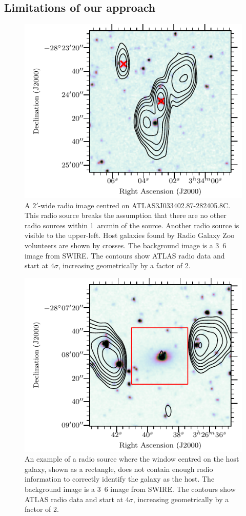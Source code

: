 \documentclass[11pt, a4paper]{book}
\begin{document}
  \subsection{Limitations of our approach}
    \label{sec:atlas-xid-limitations}

    \begin{figure}
      \centering
      \includegraphics[width=0.6\linewidth]{atlas-images/CI0077C1_fig.pdf}
      \caption[A radio source breaking our assumption that there are no other radio sources with 1~arcmin of the source.]{A $2'$-wide radio image centred on ATLAS3\textunderscore{}J033402.87-282405.8C.
        This radio source breaks the assumption that there are no other radio
        sources within 1~arcmin of the source. Another radio source is visible
        to the upper-left. Host galaxies found by Radio Galaxy Zoo volunteers
        are shown by crosses. {The background image
        is a \unit{3.6}{\micro\meter} image from SWIRE. The contours show ATLAS radio data and start at $4\sigma$, increasing geometrically by a factor of 2.}}
      \label{fig:broken-isolation}
    \end{figure}

    \begin{figure}
      \centering
      \includegraphics[width=0.6\linewidth]{atlas-images/CI2363_fig.pdf}
      \caption[A radio source where the window centred on the host galaxy does not contain enough radio information to correctly identify the galaxy as a host.]{An example of a radio source where the window centred on the
        host galaxy, shown as a rectangle, does not contain enough radio
        information to correctly identify the galaxy as the host. {The background image
        is a \unit{3.6}{\micro\meter} image from SWIRE. The contours show ATLAS radio data and start at $4\sigma$, increasing geometrically by a factor of 2.}}
      \label{fig:broken-window-size}
    \end{figure}
\end{document}
